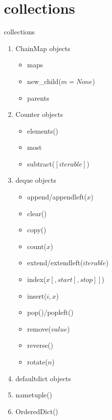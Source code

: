 \documentclass[xcolor=table]{mysld}
\begin{document}
\section{collections}
\begin{frame}[allowframebreaks]{collections}
\begin{enumerate}
\item ChainMap objects
\begin{itemize}
\item maps
\item new\_child($m=None$)
\item parents
\end{itemize}
\item Counter objects
\begin{itemize}
\item elements()
\item most
\item subtract($[iterable]$)
\end{itemize}
\framebreak
\item deque objects
\begin{itemize}
\item append/appendleft($x$)
\item clear()
\item copy()
\item count($x$)
\item extend/extendleft($iterable$)
\item index($x[, start[, stop]]$)
\item insert($i,x$)
\item pop()/popleft()
\item remove($value$)
\item reverse()
\item rotate($n$)
\end{itemize}
\framebreak
\item defaultdict objects
\item nametuple()
\item OrderedDict()
\end{enumerate}
\end{frame}
\end{document}
